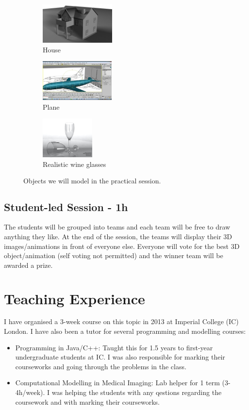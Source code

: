 \documentclass[11pt,a4paper]{article}
\begin{document}
\begin{figure}[H]
 \begin{subfigure}{0.3\textwidth}
 \centering
  \includegraphics[height=80px]{images/house.jpg}
  \caption{House}
  \label{1a}
 \end{subfigure}
 \begin{subfigure}{0.3\textwidth}
 \centering
  \includegraphics[height=80px, trim=0 0 200 0, clip]{images/plane.jpg}
  \caption{Plane}
  \label{1b}
 \end{subfigure}
 \begin{subfigure}{0.3\textwidth}
 \centering
  \includegraphics[height=80px]{images/glass03.jpg}
  \caption{Realistic wine glasses}
  \label{1c}
 \end{subfigure}
 \caption{Objects we will model in the practical session.}
\end{figure}



\subsection{Student-led Session - 1h}

The students will be grouped into teams and each team will be free to draw anything they like. At the end of the session, the teams will display their 3D images/animations in front of everyone else. Everyone will vote for the best 3D object/animation (self voting not permitted) and the winner team will be awarded a prize.


\section{Teaching Experience}

I have organised a 3-week course on this topic in 2013 at Imperial College (IC) London. I have also been a tutor for several programming and modelling courses:
\begin{itemize}
 \item Programming in Java/C++: Taught this for 1.5 years to first-year undergraduate students at IC. I was also responsible for marking their courseworks and going through the problems in the class.
 \item Computational Modelling in Medical Imaging: Lab helper for 1 term (3-4h/week). I was helping the students with any qestions regarding the coursework and with marking their courseworks.
\end{itemize}
\end{document}
